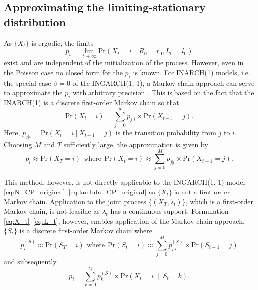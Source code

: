 \documentclass[review]{elsarticle}
\begin{document}
\subsection{Approximating the limiting-stationary distribution}

As $\{X_t\}$ is ergodic, the limits
$$
p_i = \lim_{t \rightarrow \infty} \text{Pr}(X_t = i \ \mid R_0 = r_0, L_0 = l_0)
$$
exist and are independent of the initialization of the process. However, even in the Poisson case no closed form for the $p_i$ is known. For INARCH(1) models, i.e. the special case $\beta = 0$ of the INGARCH(1, 1), a Markov chain approach can serve to approximate the $p_i$ with arbitrary precision \cite{Weiss2010}. This is based on the fact that the INARCH(1) is a discrete first-order Markov chain so that
$$
\text{Pr}(X_t = i) = \sum_{j = 0}^\infty p_{j|i} \times \text{Pr}(X_{t - 1} = j).
$$
Here, $p_{j|i} = \text{Pr}(X_t = i \ | \ X_{t - 1} = j) $ is the transition probability from $j$ to $i$. Choosing $M$ and $T$ sufficiently large, the approximation is given by
$$
p_i \approx \text{Pr}(X_T = i) \ \ \text{where} \ \ \text{Pr}(X_t = i) \approx \sum_{j = 0}^M p_{j|i} \times \text{Pr}(X_{t - 1} = j).
$$

This method, however, is not directly applicable to the INGARCH(1, 1) model \eqref{eq:N_CP_original}--\eqref{eq:lambda_CP_original} as $\{X_t\}$ is not a first-order Markov chain. Application to the joint process $\{(X_T, \lambda_t)\}$, which is a first-order Markov chain, is not feasible as $\lambda_t$ has a continuous support. Formulation \eqref{eq:X_t}--\eqref{eq:L_t}, however, enables application of the Markov chain approach. $\{S_t\}$ is a discrete first-order Markov chain where
$$
p^{(S)}_i \approx \text{Pr}(S_T = i) \ \ \text{where} \ \ \text{Pr}(S_t = i) \approx \sum_{j = 0}^M p^{(S)}_{j|i} \times \text{Pr}(S_{t - 1} = j)
$$
and subsequently
$$
p_i = \sum_{k = 0}^M p_k^{(S)} \times \text{Pr}(X_t = i \ \mid \ S_t = k).
$$
\end{document}
